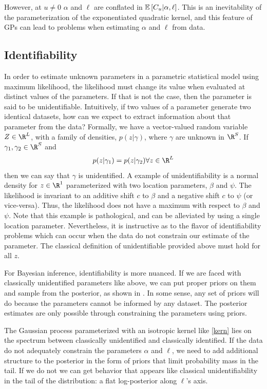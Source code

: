 \documentclass{article}
\newcommand{\Exp}[1]{\ensuremath{\mathbb{E} \lb #1 \rb}}
\newcommand{\lb}{\ensuremath{\left[}}
\newcommand{\rb}{\ensuremath{\right]}}
\begin{document}
However, at $u \neq 0$ $\alpha$ and $\ell$ are conflated in $\Exp{C_u | \alpha,
\ell}$.  This is an inevitability of the parameterization of the exponentiated
quadratic kernel, and this feature of GPs can lead to problems when 
estimating $\alpha$ and $\ell$ from data.

\subsection{Identifiability}

In order to estimate unknown parameters in a parametric statistical model using
maximum likelihood, the likelihood must change its value when evaluated at
distinct values of the parameters. If that is not the case, then the parameter
is said to be unidentifiable. Intuitively, if two values of a parameter
generate two identical datasets, how can we expect to extract information about
that parameter from the data? Formally, we have a vector-valued random variable
$Z \in \R^L$, with a family of densities, $p(z | \gamma)$, where $\gamma$ are
unknown in $\R^S$. If $\gamma_1, \gamma_2 \in \R^S$ and 
\begin{align*}
  p(z | \gamma_1) = p(z | \gamma_2) \forall z \in \R^L
\end{align*}
then we can say that $\gamma$ is unidentified. A example of unidentifiability is
a normal density for $z \in \R^1$ parameterized with two location parameters,
$\beta$ and $\psi$. The likelihood is invariant to an additive shift $c$ to
$\beta$ and a negative shift $c$ to $\psi$ (or vice-versa). Thus, the
likelihood does not have a maximum with respect to $\beta$ and $\psi$. Note
that this example is pathological, and can be alleviated by using a single
location parameter. Nevertheless, it is instructive as to the flavor of
identifiability problems which can occur when the data do not constrain our
estimate of the parameter. The classical definition of unidentifiable provided
above must hold for all $z$. 

For Bayesian inference, identifiability is more nuanced. If we are faced with
classically unidentified parameters like above, we can put proper priors on
them and sample from the posterior, as shown in \cite{xie2004note}. In some
sense, any set of priors will do because the parameters cannot be informed by
any dataset. The posterior estimates are only possible through constraining the
parameters using priors. 

The Gaussian process parameterized with an isotropic kernel like
\ref{kern} lies on the spectrum between classically unidentified and
classically identified. If the data do not adequately constrain the parameters
$\alpha$ and $\ell$, we need to add additional structure to the posterior in
the form of priors that limit probability mass in the tail. If we do not
we can get behavior that appears like classical unidentifiability in the 
tail of the distribution: a flat log-posterior along $\ell$'s axis. 
\end{document}

